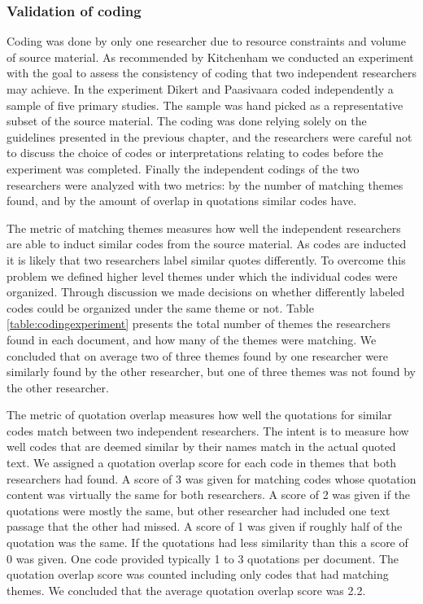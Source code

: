 \subsubsection{Validation of coding}

Coding was done by only one researcher due to resource constraints and volume of
source material. As recommended by Kitchenham \cite{Kitchenham2007} we conducted
an experiment with the goal to assess the consistency of coding that two
independent researchers may achieve.
In the experiment Dikert and Paasivaara coded independently a sample of five
primary studies. The sample was hand picked as a representative subset of the
source material. The coding was done relying solely on the guidelines presented
in the previous chapter, and the researchers were careful not to discuss the
choice of codes or interpretations relating to codes before the experiment was
completed. Finally the independent codings of the two researchers were analyzed
with two metrics: by the number of matching themes found, and by the amount of
overlap in quotations similar codes have.

The metric of matching themes measures how well the independent researchers are
able to induct similar codes from the source material. As codes are inducted it
is likely that two researchers label similar quotes differently. To overcome
this problem we defined higher level themes under which the individual codes
were organized. Through discussion we made decisions on whether differently
labeled codes could be organized under the same theme or not. Table
\ref{table:codingexperiment} presents the total number of themes the researchers
found in each document, and how many of the themes were matching. We concluded
that on average two of three themes found by one researcher were similarly found
by the other researcher, but one of three themes was not found by the other
researcher.

The metric of quotation overlap measures how well the quotations for similar
codes match between two independent researchers. The intent is to measure how
well codes that are deemed similar by their names match in the actual quoted
text. We assigned a quotation overlap score for each code in themes that both
researchers had found. A score of 3 was given for matching codes whose quotation
content was virtually the same for both researchers. A score of 2 was given if
the quotations were mostly the same, but other researcher had included one text
passage that the other had missed. A score of 1 was given if roughly half of the
quotation was the same. If the quotations had less similarity than this a score
of 0 was given. One code provided typically 1 to 3 quotations per document. The
quotation overlap score was counted including only codes that had matching
themes. We concluded that the average quotation overlap score was 2.2.

